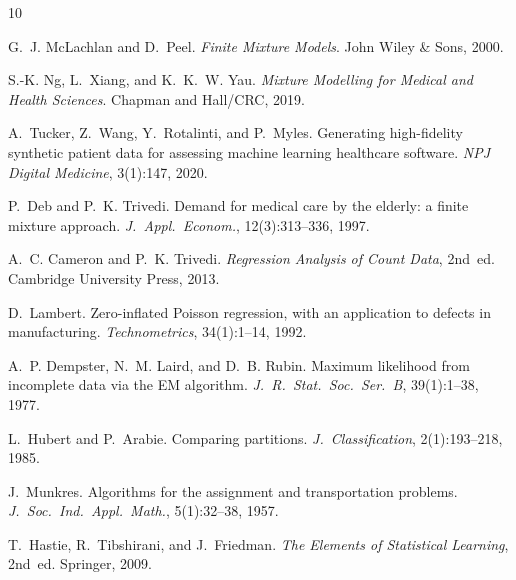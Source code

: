 \documentclass[11pt]{article}
\begin{document}
{\small
\begin{thebibliography}{10}

G.~J. McLachlan and D.~Peel.
\textit{Finite Mixture Models}.
John Wiley \& Sons, 2000.

S.-K. Ng, L.~Xiang, and K.~K.~W. Yau.
\textit{Mixture Modelling for Medical and Health Sciences}.
Chapman and Hall/CRC, 2019.

A.~Tucker, Z.~Wang, Y.~Rotalinti, and P.~Myles.
Generating high-fidelity synthetic patient data for assessing machine
learning healthcare software.
\textit{NPJ Digital Medicine}, 3(1):147, 2020.

P.~Deb and P.~K. Trivedi.
Demand for medical care by the elderly: a finite mixture approach.
\textit{J.\ Appl.\ Econom.}, 12(3):313--336, 1997.

A.~C. Cameron and P.~K. Trivedi.
\textit{Regression Analysis of Count Data}, 2nd~ed.
Cambridge University Press, 2013.

D.~Lambert.
Zero-inflated Poisson regression, with an application to defects in
manufacturing.
\textit{Technometrics}, 34(1):1--14, 1992.

A.~P. Dempster, N.~M. Laird, and D.~B. Rubin.
Maximum likelihood from incomplete data via the EM algorithm.
\textit{J.\ R.\ Stat.\ Soc.\ Ser.\ B}, 39(1):1--38, 1977.

L.~Hubert and P.~Arabie.
Comparing partitions.
\textit{J.\ Classification}, 2(1):193--218, 1985.

J.~Munkres.
Algorithms for the assignment and transportation problems.
\textit{J.\ Soc.\ Ind.\ Appl.\ Math.}, 5(1):32--38, 1957.

T.~Hastie, R.~Tibshirani, and J.~Friedman.
\textit{The Elements of Statistical Learning}, 2nd~ed.
Springer, 2009.

\end{thebibliography}
}
\end{document}
